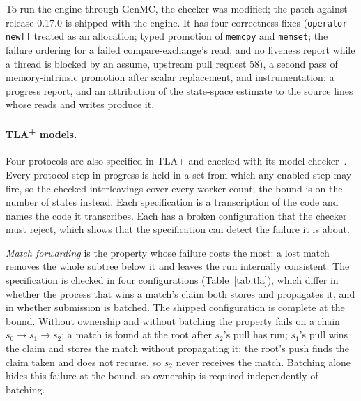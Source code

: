 To run the engine through GenMC, the checker was modified; the patch against release 0.17.0 is
shipped with the engine. It has four correctness fixes (\texttt{operator new[]} treated as an
allocation; typed promotion of \texttt{memcpy} and \texttt{memset}; the failure ordering for a
failed compare-exchange's read; and no liveness report while a thread is blocked by an assume,
upstream pull request 58), a second pass of memory-intrinsic promotion after scalar replacement,
and instrumentation: a progress report, and an attribution of the state-space estimate to the
source lines whose reads and writes produce it.

\paragraph{TLA\textsuperscript{+} models.}
Four protocols are also specified in TLA+ and checked with its model checker~\cite{lamport2002specifying}.
Every protocol step in progress is held in a set from which any enabled step may fire, so the
checked interleavings cover every worker count; the bound is on the number of states instead. Each
specification is a transcription of the code and names the code it transcribes. Each has a broken
configuration that the checker must reject, which shows that the specification can detect the
failure it is about.

\emph{Match forwarding} is the property whose failure costs the most: a lost match removes the
whole subtree below it and leaves the run internally consistent. The specification is checked in
four configurations (Table~\ref{tab:tla}), which differ in whether the process that wins a match's
claim both stores and propagates it, and in whether submission is batched. The shipped
configuration is complete at the bound. Without ownership and without batching the property fails
on a chain $s_0 \to s_1 \to s_2$: a match is found at the root after $s_2$'s pull has run; $s_1$'s
pull wins the claim and stores the match without propagating it; the root's push finds the claim
taken and does not recurse, so $s_2$ never receives the match. Batching alone hides this failure at
the bound, so ownership is required independently of batching.

